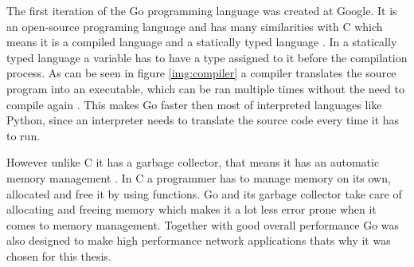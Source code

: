 The first iteration of the Go programming language was created at Google. It is an open-source programing language and has many similarities with C which means it is a compiled language and a statically typed language \cite{Donovan2016}. In a statically typed language a variable has to have a type assigned to it before the compilation process. As can be seen in figure \ref{img:compiler} a compiler translates the source program into an executable, which can be ran multiple times without the need to compile again \cite{Aho2006}. This makes Go faster then most of interpreted languages like Python, since an interpreter needs to translate the source code every time it has to run.


However unlike C it has a garbage collector, that means it has an automatic memory management \cite{Donovan2016}. In C a programmer has to manage memory on its own, allocated and free it by using functions. Go and its garbage collector take care of allocating and freeing memory which makes it a lot less error prone when it comes to memory management. Together with good overall performance Go was also designed to make high performance network applications thats why it was chosen for this thesis.